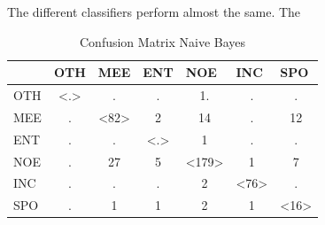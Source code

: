 \documentclass[
10pt, %
a4paper, %
oneside, %
headinclude,footinclude, %
BCOR5mm, %
]{scrartcl}
\begin{document}
The different classifiers perform almost the same. The 

\begin{table}[h]
\caption[Table caption text]{Confusion Matrix Naive Bayes }
\begin{tabular}{|l|c|c|c|c|c|c|}
\hline
    & \multicolumn{1}{l|}{OTH} & \multicolumn{1}{l|}{MEE} & \multicolumn{1}{l|}{ENT} & \multicolumn{1}{l|}{NOE} & \multicolumn{1}{l|}{INC} & \multicolumn{1}{l|}{SPO} \\ \hline
OTH & \textless.\textgreater   & .                        & .                        & 1.                       & .                        & .                        \\ \hline
MEE & .                        & \textless82\textgreater  & 2                        & 14                       & .                        & 12                       \\ \hline
ENT & .                        & .                        & \textless.\textgreater   & 1                        & .                        & .                        \\ \hline
NOE & .                        & 27                       & 5                        & \textless179\textgreater & 1                        & 7                        \\ \hline
INC & .                        & .                        & .                        & 2                        & \textless76\textgreater  & .                        \\ \hline
SPO & .                        & 1                        & 1                        & 2                        & 1                        & \textless16\textgreater  \\ \hline
\end{tabular}


\end{table}
\end{document}
